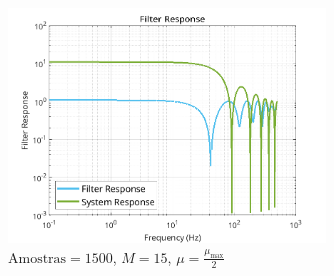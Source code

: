 \documentclass[a4paper,10pt]{article}
\begin{document}
\begin{enumerate}
				\begin{figure}[!ht]
					\centering
					\includegraphics[width=0.75\textwidth]{figs/L3Q5_filter_response.png}
					\caption{$\text{Amostras} = 1500$, $M = 15$, $\mu = \frac{\mu_{\text{max}}}{2}$}
					\label{fig:filter_response}
				\end{figure}

		\end{enumerate}
	
\end{document}
